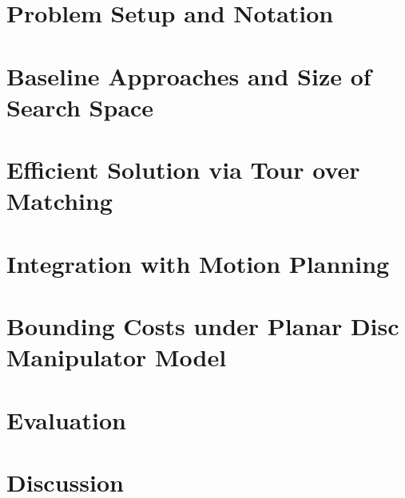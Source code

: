\documentclass[journal]{IEEEtran}
\begin{document}
\section{Problem Setup and Notation}
\label{sec:problem}


\section{Baseline Approaches and Size of Search Space}
\label{sec:baseline}


\section{Efficient Solution via Tour over Matching}
\label{sec:approximation}


\section{Integration with Motion Planning}
\label{sec:integration}


\section{Bounding Costs under Planar Disc Manipulator Model}
\label{sec:cost_bounds}


\section{Evaluation}
\label{sec:evaluation}


\section{Discussion}
\label{sec:discussion}

\end{document}
